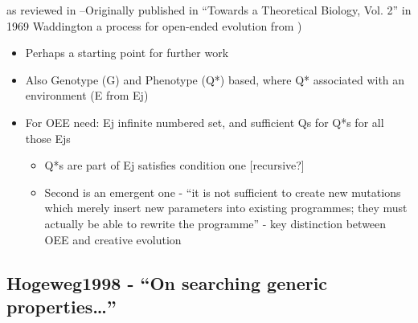 \autocite{Waddington2008} as reviewed in \autocite{Taylor:1999sc}--Originally published in ``Towards a Theoretical Biology, Vol. 2'' in 1969
Waddington a process for open-ended evolution from \autocite{Taylor})

\begin{itemize}
	\item
	
	Perhaps a starting point for further work
	
	\item
	
	Also Genotype (G) and Phenotype (Q*) based, where Q* associated with
	an environment (E from Ej)
	
	\item
	
	For OEE need: Ej infinite numbered set, and sufficient Qs for Q*s
	for all those Ejs
	
	
	\begin{itemize}
		\item
		
		Q*s are part of Ej satisfies condition one {[}recursive?{]}
		
		\item
		
		Second is an emergent one - ``it is not sufficient to create new
		mutations which merely insert new parameters into existing
		programmes; they must actually be able to rewrite the programme''
		- key distinction between OEE and creative evolution
		
	\end{itemize}
\end{itemize}

		
		
		\hypertarget{hogeweg1998---on-searching-generic-properties}{\subsection{Hogeweg1998
				- ``On searching generic
				properties\ldots{}''}\label{hogeweg1998---on-searching-generic-properties}}
		
